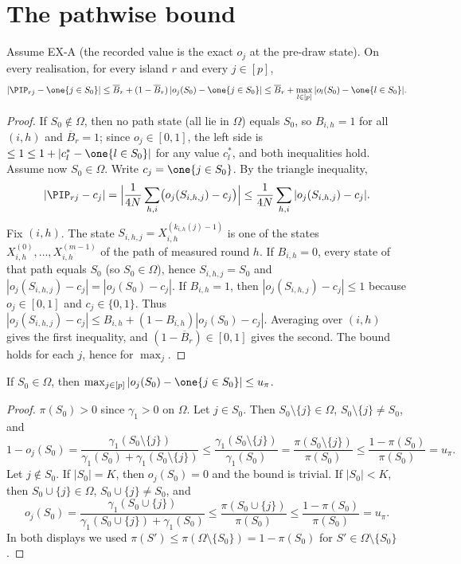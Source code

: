 \documentclass[11pt]{report}
\begin{document}
\section{The pathwise bound}

\begin{T23lemma}\label{T23:lem:pathwise}
Assume EX-A (the recorded value is the exact $o_j$ at the pre-draw state). On every realisation, for every island $r$ and every $j\in[p]$,
\[
|\PIP_{rj}-\one\{j\in S_0\}|\le \overline B_r+(1-\overline B_r)\,|o_j(S_0)-\one\{j\in S_0\}|
\le \overline B_r+\max_{l\in[p]}|o_l(S_0)-\one\{l\in S_0\}|.
\]
\end{T23lemma}

\begin{proof}
If $S_0\notin\Omega$, then no path state (all lie in $\Omega$) equals $S_0$, so $B_{i,h}=1$ for all $(i,h)$ and $\overline B_r=1$; since $o_j\in[0,1]$, the left side is $\le1\le1+|c_l^\ast-\one\{l\in S_0\}|$ for any value $c_l^\ast$, and both inequalities hold. Assume now $S_0\in\Omega$.
Write $c_j=\one\{j\in S_0\}$. By the triangle inequality,
\[
|\PIP_{rj}-c_j|=\Bigl|\frac1{4N}\sum_{h,i}\bigl(o_j(S_{i,h,j})-c_j\bigr)\Bigr|\le\frac1{4N}\sum_{h,i}|o_j(S_{i,h,j})-c_j| .
\]
Fix $(i,h)$. The state $S_{i,h,j}=X^{(k_{i,h}(j)-1)}_{i,h}$ is one of the states $X^{(0)}_{i,h},\dots,X^{(m-1)}_{i,h}$ of the path of measured round $h$.
If $B_{i,h}=0$, every state of that path equals $S_0$ (so $S_0\in\Omega$), hence $S_{i,h,j}=S_0$ and $|o_j(S_{i,h,j})-c_j|=|o_j(S_0)-c_j|$.
If $B_{i,h}=1$, then $|o_j(S_{i,h,j})-c_j|\le1$ because $o_j\in[0,1]$ and $c_j\in\{0,1\}$.
Thus $|o_j(S_{i,h,j})-c_j|\le B_{i,h}+(1-B_{i,h})|o_j(S_0)-c_j|$. Averaging over $(i,h)$ gives the first inequality, and $(1-\overline B_r)\in[0,1]$ gives the second. The bound holds for each $j$, hence for $\max_j$.
\end{proof}

\begin{T23lemma}\label{T23:lem:truth}
If $S_0\in\Omega$, then $\max_{j\in[p]}|o_j(S_0)-\one\{j\in S_0\}|\le u_\pi$.
\end{T23lemma}

\begin{proof}
$\pi(S_0)>0$ since $\gamma_1>0$ on $\Omega$. Let $j\in S_0$. Then $S_0\setminus\{j\}\in\Omega$, $S_0\setminus\{j\}\neq S_0$, and
\[
1-o_j(S_0)=\frac{\gamma_1(S_0\setminus\{j\})}{\gamma_1(S_0)+\gamma_1(S_0\setminus\{j\})}\le\frac{\gamma_1(S_0\setminus\{j\})}{\gamma_1(S_0)}=\frac{\pi(S_0\setminus\{j\})}{\pi(S_0)}\le\frac{1-\pi(S_0)}{\pi(S_0)}=u_\pi .
\]
Let $j\notin S_0$. If $|S_0|=K$, then $o_j(S_0)=0$ and the bound is trivial. If $|S_0|<K$, then $S_0\cup\{j\}\in\Omega$, $S_0\cup\{j\}\ne S_0$, and
\[
o_j(S_0)=\frac{\gamma_1(S_0\cup\{j\})}{\gamma_1(S_0\cup\{j\})+\gamma_1(S_0)}\le\frac{\pi(S_0\cup\{j\})}{\pi(S_0)}\le\frac{1-\pi(S_0)}{\pi(S_0)}=u_\pi .
\]
In both displays we used $\pi(S')\le\pi(\Omega\setminus\{S_0\})=1-\pi(S_0)$ for $S'\in\Omega\setminus\{S_0\}$.
\end{proof}
\end{document}
